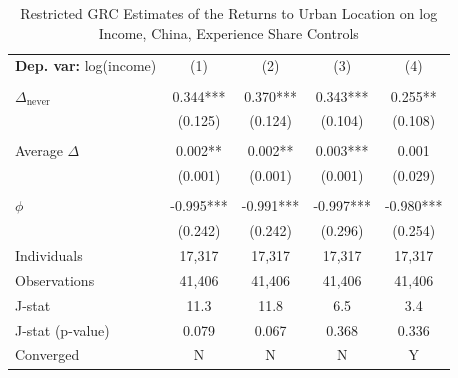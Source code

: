 \begin{table}[htbp] \centering \begin{threeparttable}
 \caption{Restricted GRC Estimates of the Returns to Urban Location on log Income, China, Experience Share Controls} 
 \label{tab:GRC_CHN_income_urban_unb_exp_sh} 
\begin{tabular}{l cccc} \toprule  \textbf{Dep. var:}  log(income) 
                    &\multicolumn{1}{c}{(1)}   &\multicolumn{1}{c}{(2)}   &\multicolumn{1}{c}{(3)}   &\multicolumn{1}{c}{(4)}   \\
                    &               &               &               &               \\
\addlinespace
$\Delta_{\text{never}}$&       0.344***&       0.370***&       0.343***&       0.255** \\
                    &     (0.125)   &     (0.124)   &     (0.104)   &     (0.108)   \\
                    &               &               &               &               \\
\addlinespace
Average $\Delta$    &       0.002** &       0.002** &       0.003***&       0.001   \\
                    &     (0.001)   &     (0.001)   &     (0.001)   &     (0.029)   \\
                    &               &               &               &               \\
\addlinespace
$\phi$              &      -0.995***&      -0.991***&      -0.997***&      -0.980***\\
                    &     (0.242)   &     (0.242)   &     (0.296)   &     (0.254)   \\
\addlinespace
Individuals         &      17,317   &      17,317   &      17,317   &      17,317   \\
Observations        &      41,406   &      41,406   &      41,406   &      41,406   \\
J-stat              &        11.3   &        11.8   &         6.5   &         3.4   \\
J-stat (p-value)    &       0.079   &       0.067   &       0.368   &       0.336   \\
Converged           &           N   &           N   &           N   &           Y   \\

\end{tabular}
\end{threeparttable}
\end{table}
